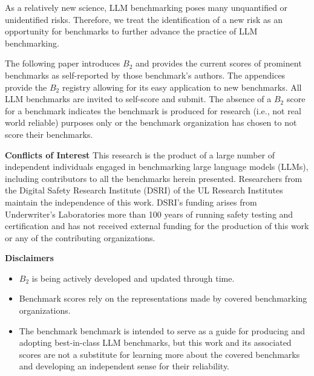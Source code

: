 \documentclass{article}
\newcommand\bb{$B_2$ }
\begin{document}
As a relatively new science, LLM benchmarking poses many unquantified or unidentified risks. Therefore, we treat the identification of a new risk as an opportunity for benchmarks to further advance the practice of LLM benchmarking.

The following paper introduces \bb and provides the current scores of prominent benchmarks as self-reported by those benchmark's authors. The appendices provide the \bb registry allowing for its easy application to new benchmarks. All LLM benchmarks are invited to self-score and submit. The absence of a \bb score for a benchmark indicates the benchmark is produced for research (i.e., not real world reliable) purposes only or the benchmark organization has chosen to not score their benchmarks. 

\begin{center}
    \begin{tcolorbox}[colback=blue!10, colframe=blue!50, width=\textwidth, boxrule=0.5mm, sharp corners, coltext=black, halign=left]
        \textbf{Conflicts of Interest}
This research is the product of a large number of independent individuals engaged in benchmarking large language models (LLMs), including contributors to all the benchmarks herein presented. Researchers from the Digital Safety Research Institute (DSRI) of the UL Research Institutes maintain the independence of this work. DSRI's funding arises from Underwriter's Laboratories more than 100 years of running safety testing and certification and has not received external funding for the production of this work or any of the contributing organizations.
\end{tcolorbox}
\end{center}

\begin{center}
    \begin{tcolorbox}[colback=blue!10, colframe=blue!50, width=\textwidth, boxrule=0.5mm, sharp corners, coltext=black, halign=left]
\textbf{Disclaimers}
\begin{itemize}
\item \bb is being actively developed and updated through time.
\item Benchmark scores rely on the representations made by covered benchmarking organizations.
\item The benchmark benchmark is intended to serve as a guide for producing and adopting best-in-class LLM benchmarks, but this work and its associated scores are not a substitute for learning more about the covered benchmarks and developing an independent sense for their reliability.
\end{itemize}
    \end{tcolorbox}
\end{center}
\end{document}

